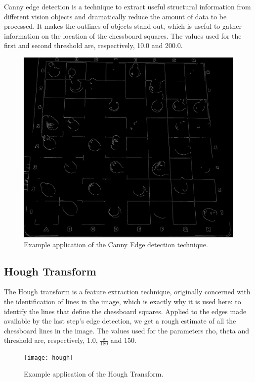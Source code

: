 \documentclass[10pt]{article}
\begin{document}
Canny edge detection is a technique to extract useful structural information from different vision objects and dramatically reduce the amount of data to be processed. It makes the outlines of objects stand out, which is useful to gather information on the location of the chessboard squares. The values used for the first and second threshold are, respectively, 10.0 and 200.0.

\begin{figure}[H]
	\centering
	\includegraphics[scale=0.15]{canny-edge}
	\caption{Example application of the Canny Edge detection technique.}\label{fig:canny-edge}
\end{figure}

\subsection{Hough Transform}

The Hough transform is a feature extraction technique, originally concerned with the identification of lines in the image, which is exactly why it is used here: to identify the lines that define the chessboard squares. Applied to the edges made available by the last step's edge detection, we get a rough estimate of all the chessboard lines in the image. The values used for the parameters rho, theta and threshold are, respectively, 1.0, $\frac{\pi}{180}$ and 150.

\begin{figure}[H]
	\centering
	\texttt{[image: hough]}
	\caption{Example application of the Hough Transform.}\label{fig:hough}
\end{figure}
\end{document}
